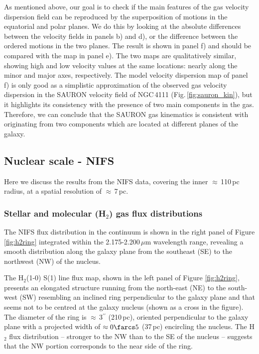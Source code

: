 \documentclass[fleqn,usenatbib]{mnras}
\begin{document}
As mentioned above, our goal is to check if the main features of the gas velocity dispersion field can be reproduced by the superposition of motions in the equatorial and polar planes. We do this by looking at the absolute differences between the velocity fields in panels b) and d), or the difference between the ordered motions in the two planes. The result is shown in panel f) and should be compared with the map in panel e). The two maps are qualitatively similar, showing high and low velocity values at the same locations: nearly along the minor and major axes, respectively. The model velocity dispersion map of panel f) is only good as a simplistic approximation of the observed gas velocity dispersion in the SAURON velocity field of NGC\,4111 (Fig.\,\ref{fig:sauron_kin}), but it highlights its consistency with the presence of two main components in the gas. Therefore, we can conclude that the SAURON gas kinematics is consistent with originating from two components which are located at different planes of the galaxy. 

\subsection{Nuclear scale - NIFS}

Here we discuss the results from the NIFS data, covering the inner $\approx$\,110\,pc radius, at a spatial resolution of $\approx$\,7\,pc.

\subsubsection{Stellar and molecular (H$_2$) gas flux distributions}

The NIFS flux distribution in the continuum is shown in the right panel of Figure \ref{fig:h2ring} integrated within the 2.175-2.200\,$\mu$m wavelength range, revealing a smooth distribution along the galaxy plane from the southeast (SE) to the northwest (NW) of the nucleus.

The H$_2$(1-0) S(1) line flux map, shown in the left panel of Figure \ref{fig:h2ring}, presents an elongated structure running from the north-east (NE) to the south-west (SW) resembling an inclined ring perpendicular to the galaxy plane and that seems not to be centred at the galaxy nucleus (shown as a cross in the figure). The diameter of the ring is $\approx$\,3$^{\prime\prime}$ (210\,pc), oriented perpendicular to the galaxy plane with a projected width of $\approx0\farcs5$ (37\,pc) encircling the nucleus. The H$_2$ flux distribution -- stronger to the NW than to the SE of the nucleus -- suggests that the NW portion corresponds to the near side of the ring.
\end{document}
